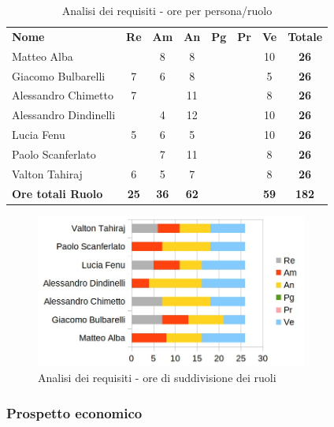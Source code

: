 		\begin{table} [h!]
			\begin{center}
				\begin{tabular} { m{3.5cm} c c c c c c c }
					\rowcolor{lightgray}
					\textbf{Nome} & \textbf{Re} & \textbf{Am} & \textbf{An} & \textbf{Pg} & \textbf{Pr} & \textbf{Ve} & \textbf{Totale} \\
					Matteo Alba & & 8 & 8 & & & 10 & \textbf{26} \\
					Giacomo Bulbarelli & 7 & 6 & 8 & & & 5 & \textbf{26} \\
					Alessandro Chimetto & 7 & & 11 & & & 8 & \textbf{26} \\
					Alessandro Dindinelli & & 4 & 12 & & & 10 & \textbf{26} \\
					Lucia Fenu & 5 & 6 & 5 & & & 10 & \textbf{26} \\
					Paolo Scanferlato & & 7 & 11 & & & 8 & \textbf{26} \\
					Valton Tahiraj & 6 & 5 & 7 & & & 8 & \textbf{26} \\
					\textbf{Ore totali Ruolo} & \textbf{25} & \textbf{36} & \textbf{62} & \textbf{} & \textbf{}& \textbf{59} & \textbf{182}
				\end{tabular}
				\caption{Analisi dei requisiti - ore per persona/ruolo}
			\end{center}
		\end{table}

		\begin{figure} [h!]
			\centering
			\includegraphics[width=0.8\textwidth]{res/img/grafici/analisi_dei_requisiti_ore_ruolo.jpg}
			\caption{Analisi dei requisiti - ore di suddivisione dei ruoli} 
		\end{figure}

	\newpage

	\subsubsection{Prospetto economico}

